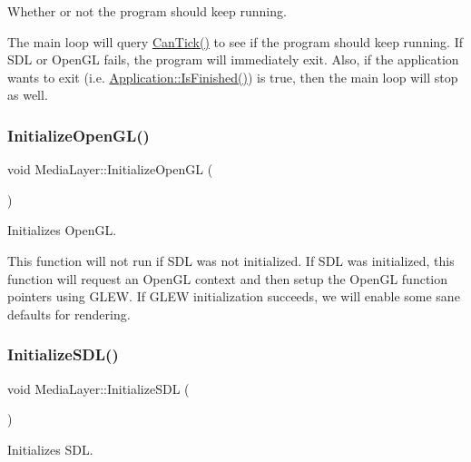 Whether or not the program should keep running. 

The main loop will query \hyperlink{class_media_layer_a023b4033ca8a44d25c6e37a0ff4178e8}{Can\+Tick()} to see if the program should keep running. If S\+DL or Open\+GL fails, the program will immediately exit. Also, if the application wants to exit (i.\+e. \hyperlink{class_application_a454a1d926759c4bfac47e730570a7743}{Application\+::\+Is\+Finished()}) is true, then the main loop will stop as well. \hypertarget{class_media_layer_abb3502cb44e707538741f55f5fe81361}{}\label{class_media_layer_abb3502cb44e707538741f55f5fe81361} 
\subsubsection{\texorpdfstring{Initialize\+Open\+G\+L()}{InitializeOpenGL()}}
{\footnotesize\ttfamily void Media\+Layer\+::\+Initialize\+Open\+GL (\begin{DoxyParamCaption}{ }\end{DoxyParamCaption})\hspace{0.3cm}{\ttfamily [private]}}



Initializes Open\+GL. 

This function will not run if S\+DL was not initialized. If S\+DL was initialized, this function will request an Open\+GL context and then setup the Open\+GL function pointers using G\+L\+EW. If G\+L\+EW initialization succeeds, we will enable some sane defaults for rendering. \hypertarget{class_media_layer_ad72130dbe963e351d5749a7f48b4ef97}{}\label{class_media_layer_ad72130dbe963e351d5749a7f48b4ef97} 
\subsubsection{\texorpdfstring{Initialize\+S\+D\+L()}{InitializeSDL()}}
{\footnotesize\ttfamily void Media\+Layer\+::\+Initialize\+S\+DL (\begin{DoxyParamCaption}{ }\end{DoxyParamCaption})\hspace{0.3cm}{\ttfamily [private]}}



Initializes S\+DL. 

